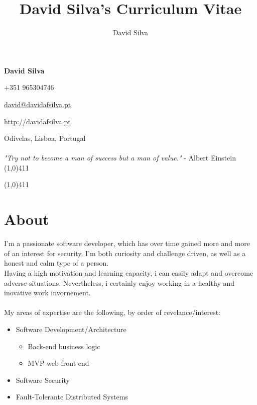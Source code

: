 \documentclass[10pt]{article}
\title{David Silva's Curriculum Vitae}
\author{David Silva}
\newenvironment{listing}{
 \begin{itemize}
  \setlength{\itemsep}{1pt}
  \setlength{\parskip}{0pt}
  \setlength{\parsep}{0pt}
}{\end{itemize}}
\begin{document}
\pagestyle{fancy}
	
\begin{minipage}[ht]{0.46\textwidth}
	\vspace{-5mm}\Huge{\textbf{David Silva}}
\end{minipage}
\begin{minipage}[ht]{0.46\textwidth}
\hfill +351 965304746

\hfill \href{mailto:david@davidafsilva.pt}{david@davidafsilva.pt}

\hfill \url{http://davidafsilva.pt}
\end{minipage}

\begin{minipage}[ht]{0.925\textwidth}
\vspace{-3mm} Odivelas, Lisboa, Portugal \\\\
\vspace{0 mm} \hfill \footnotesize{
\textit{"Try not to become a man of success but a man of value."} - Albert Einstein
}
\line(1,0){411}
\vspace{0.5mm}
\end{minipage}

\line(1,0){411}
\vspace{2em}

\section*{About}
	I'm a passionate software developer, which has over time gained more and more of an interest for security. 
I'm both curiosity and challenge driven, as well as a honest and calm type of a person.\\
Having a high motivation and learning capacity, i can easily adapt and overcome adverse situations. Nevertheless, i certainly enjoy working in a healthy and inovative work invornement.\\\\
My areas of expertise are the following, by order of revelance/interest:
\begin{listing}
	\item Software Development/Architecture
	 	\begin{listing}
			\item Back-end business logic
			\item MVP web front-end
		\end{listing}
	\item Software Security
	\item Fault-Tolerante Distributed Systems
\end{listing}
\end{document}
